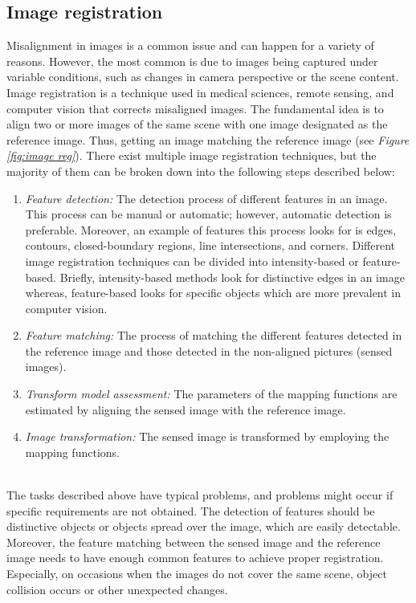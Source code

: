 \subsection{Image registration}
Misalignment in images is a common issue and can happen for a variety of reasons. However, the most common is due to images being captured under variable conditions, such as changes in camera perspective or the scene content. Image registration\cite{Nag} is a technique used in medical sciences, remote sensing, and computer vision that corrects misaligned images. The fundamental idea is to align two or more images of the same scene with one image designated as the reference image. Thus, getting an image matching the reference image (see \textit{Figure \ref{fig:image reg}}). There exist multiple image registration techniques, but the majority of them can be broken down into the following steps described below: \\
\begin{enumerate}
    \item \textit{Feature detection:} The detection process of different features in an image. This process can be manual or automatic; however, automatic detection is preferable. Moreover, an example of features this process looks for is edges, contours, closed-boundary regions, line intersections, and corners. Different image registration techniques can be divided into intensity-based or feature-based. Briefly, intensity-based methods look for distinctive edges in an image whereas, feature-based looks for specific objects which are more prevalent in computer vision. 
    \item \textit{Feature matching:} The process of matching the different features detected in the reference image and those detected in the non-aligned pictures (sensed images). 
    \item \textit{Transform model assessment:} The parameters of the mapping functions are estimated by aligning the sensed image with the reference image. 
    \item \textit{Image transformation:} The sensed image is transformed by employing the mapping functions.
\end{enumerate} 
\ \\
\noindent The tasks described above have typical problems, and problems might occur if specific requirements are not obtained\cite{Zitova}. The detection of features should be distinctive objects or objects spread over the image, which are easily detectable. Moreover, the feature matching between the sensed image and the reference image needs to have enough common features to achieve proper registration. Especially, on occasions when the images do not cover the same scene, object collision occurs or other unexpected changes. \\

